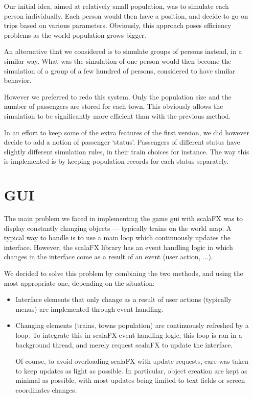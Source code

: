 \documentclass{article}
\begin{document}
Our initial idea, aimed at relatively small population, was to simulate each person individually.
Each person would then have a position, and decide to go on trips based on various parameters.
Obviously, this approach poses efficiency problems as the world population grows bigger.

An alternative that we considered is to simulate groups of persons instead, in a similar way.
What was the simulation of one person would then become the simulation of a group of a few hundred of persons,
considered to have similar behavior.

However we preferred to redo this system. Only the population size and the number of passengers are stored
for each town. This obviously allows the simulation to be significantly more efficient than with the previous method.

In an effort to keep some of the extra features of the first version, we did however decide to add
a notion of passenger `status'. Passengers of different status have slightly different simulation rules,
in their train choices for instance. The way this is implemented is by keeping population records for each 
status separately.

\section{GUI}
The main problem we faced in implementing the game gui with scalaFX was to display constantly changing objects ---
typically trains on the world map. A typical way to handle is to use a main loop which continuously updates the interface.
However, the scalaFX library has an event handling logic in which changes in the interface come as a result of an event (user action, ...).

We decided to solve this problem by combining the two methods, 
and using the most appropriate one, depending on the situation:
\begin{itemize}
\item Interface elements that only change as a result of user actions (typically menus) 
are implemented through event handling.

\item Changing elements (trains, towns population) are continuously refreshed by a loop.
To integrate this in scalaFX event handling logic, this loop is ran in a background thread,
and merely request scalaFX to update the interface.

Of course, to avoid overloading scalaFX with update requests, care was taken to keep updates as light as possible.
In particular, object creation are kept as minimal as possible, with most updates being limited to text fields
or screen coordinates changes.
\end{itemize}
\end{document}
